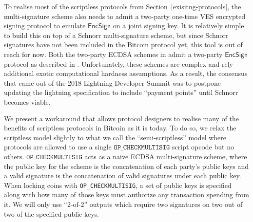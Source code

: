 \documentclass[fullpage]{article}
\theoremstyle{definition}
\newcommand{\OPCHECKMULTISIG}{\texttt{OP\_CHECKMULTISIG}\xspace}
\newcommand{\EncSign}{\textsf{EncSign}}
\begin{document}
To realise most of the scriptless protocols from Section~\ref{exisitng-protocols}, the multi-signature scheme also needs to admit a two-party one-time VES encrypted signing protocol to emulate $\EncSign$ on a joint signing key. It is relatively simple to build this on top of a Schnorr multi-signature scheme, but since Schnorr signatures have not been included in the Bitcoin protocol yet, this tool is out of reach for now. Both the two-party ECDSA schemes in \cite{Lindell2pECDSA,hash-proof-ecdsa} admit a two-party $\EncSign$ protocol as described in \cite{ecdsa-scriptless-scripts}. Unfortunately, these schemes are complex and rely additional exotic computational hardness assumptions. As a result, the consensus that came out of the 2018 Lightning Developer Summit was to postpone updating the lightning specification to include ``payment points'' until Schnorr becomes viable.\cite{zmn-2pecdsa}

We present a workaround that allows protocol designers to realise many of the benefits of scriptless protocols in Bitcoin as it is today. To do so, we relax the scriptless model slightly to what we call the ``semi-scriptless'' model where protocols are allowed to use a single $\OPCHECKMULTISIG$ script opcode but no others. $\OPCHECKMULTISIG$ acts as a naive ECDSA multi-signature scheme, where the public key for the scheme is the concatenation of each party's public keys and a valid signature is the concatenation of valid signatures under each public key. When locking coins with \OPCHECKMULTISIG, a set of public keys is specified along with how many of those keys must authorize any transaction spending from it. We will only use ``2-of-2'' outputs which require two signatures on two out of two of the specified public keys.
\end{document}
